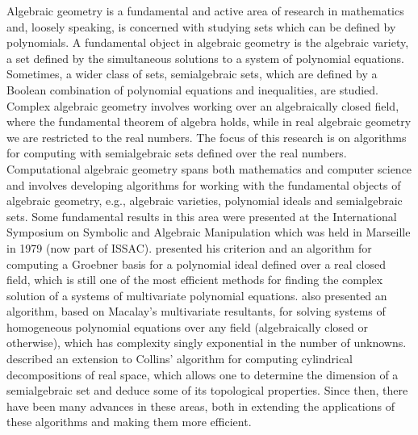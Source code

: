\documentclass[
]{book}
\theoremstyle{definition}
\theoremstyle{definition}
\theoremstyle{definition}
\theoremstyle{definition}
\theoremstyle{remark}
\begin{document}
Algebraic geometry is a fundamental and active area of research in mathematics and, loosely speaking, is concerned with
studying sets which can be defined by polynomials. A fundamental object in algebraic geometry is the algebraic variety,
a set defined by the simultaneous solutions to a system of polynomial equations. Sometimes, a wider class of sets,
semialgebraic sets, which are defined by a Boolean combination of polynomial equations and inequalities, are studied. Complex algebraic geometry involves working over an algebraically closed field, where the fundamental theorem of algebra holds, while in real algebraic geometry we are restricted to the real numbers. The focus of this research is on algorithms for computing with semialgebraic sets defined over the real numbers.
Computational algebraic geometry spans both mathematics and computer science and involves developing algorithms for working with the fundamental objects of algebraic geometry, e.g., algebraic varieties, polynomial ideals and semialgebraic sets.
Some fundamental results in this area were presented at the International Symposium on Symbolic and Algebraic Manipulation which was held in Marseille in 1979 (now part of ISSAC).
\citet{buchberger1979} presented his criterion and an algorithm for computing a Groebner basis for a polynomial ideal defined over a real closed field, which is still one of the most efficient methods for finding the complex solution of a systems of multivariate polynomial equations.
\citet{lazard1979} also presented an algorithm, based on Macalay's multivariate resultants, for solving systems of homogeneous polynomial equations over any field (algebraically closed or otherwise), which has complexity singly exponential in the number of unknowns.
\citet{arnon1979} described an extension to Collins' algorithm for computing cylindrical decompositions of real space, which allows one to determine the dimension of a semialgebraic set and deduce some of its topological properties.
Since then, there have been many advances in these areas, both in extending the applications of these algorithms and making them more efficient.
\end{document}
